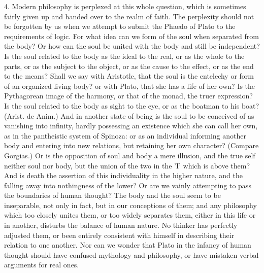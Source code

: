 4. Modern philosophy is perplexed at this whole question, which is
sometimes fairly given up and handed over to the realm of faith. The
perplexity should not be forgotten by us when we attempt to submit the
Phaedo of Plato to the requirements of logic. For what idea can we form
of the soul when separated from the body? Or how can the soul be united
with the body and still be independent? Is the soul related to the
body as the ideal to the real, or as the whole to the parts, or as the
subject to the object, or as the cause to the effect, or as the end to
the means? Shall we say with Aristotle, that the soul is the entelechy
or form of an organized living body? or with Plato, that she has a life
of her own? Is the Pythagorean image of the harmony, or that of the
monad, the truer expression? Is the soul related to the body as sight to
the eye, or as the boatman to his boat? (Arist. de Anim.) And in
another state of being is the soul to be conceived of as vanishing into
infinity, hardly possessing an existence which she can call her own,
as in the pantheistic system of Spinoza: or as an individual informing
another body and entering into new relations, but retaining her own
character? (Compare Gorgias.) Or is the opposition of soul and body a
mere illusion, and the true self neither soul nor body, but the union
of the two in the 'I' which is above them? And is death the assertion
of this individuality in the higher nature, and the falling away into
nothingness of the lower? Or are we vainly attempting to pass
the boundaries of human thought? The body and the soul seem to be
inseparable, not only in fact, but in our conceptions of them; and any
philosophy which too closely unites them, or too widely separates them,
either in this life or in another, disturbs the balance of human nature.
No thinker has perfectly adjusted them, or been entirely consistent with
himself in describing their relation to one another. Nor can we
wonder that Plato in the infancy of human thought should have confused
mythology and philosophy, or have mistaken verbal arguments for real
ones.

